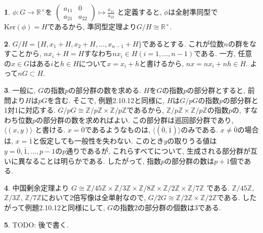 \documentclass{article}
\theoremstyle{definition}
\newtheorem{ans}{}
\numberwithin{ans}{subsection}
\newcommand{\Z}[1]{\mathbb{Z}/#1\mathbb{Z}}
\newcommand{\Ker}[1]{\mathrm{Ker}(#1)}
\begin{document}
\begin{ans}
  $\phi: G \rightarrow \mathbb{R}^\times$を
  $\begin{pmatrix}
    a_{11} & 0 \\
    a_{21} & a_{22}
  \end{pmatrix} \mapsto \frac{a_{11}}{a_{22}}$
  と定義すると, $\phi$は全射準同型で$\Ker{\phi} = H$であるから,
  準同型定理より$G/H \cong \mathbb{R}^\times$.
\end{ans}

\begin{ans}
  $G/H = \{H, x_1 + H, x_2 + H,..., x_{n-1} + H\}$であるとする.
  これが位数$n$の群をなすことから, $nx_i + H = H$すなわち$nx_i \in H (i = 1,..., n-1)$である.
  一方, 任意の$x \in G$はある$i$と$h \in H$について$x = x_i + h$と書けるから,
  $nx = nx_i + nh \in H$. よって$nG \subset H$.
\end{ans}

\begin{ans}
  一般に, $G$の指数$p$の部分群の数を求める.
  $H$を$G$の指数$p$の部分群とすると, 前問より$H$は$pG$を含む.
  そこで, 例題2.10.12と同様に, $H$は$G/pG$の指数$p$の部分群と1対1に対応する.
  $G/pG \cong \Z{p} \times \Z{p}$であるから,
  $\Z{p} \times \Z{p}$の指数$p$の, すなわち位数$p$の部分群の数を求めればよい.
  この部分群は巡回部分群であり, $\langle(x, y)\rangle$ と書ける.
  $x = \overline{0}$であるようなものは, $\langle(\overline{0}, \overline{1})\rangle$のみである.
  $x \neq \overline{0}$の場合は, $x = \overline{1}$と仮定しても一般性を失わない.
  このとき$y$の取りうる値は$y = \overline{0}, \overline{1},..., \overline{p-1}$の$p$通りであるが,
  これらすべてについて, 生成される部分群が互いに異なることは明らかである.
  したがって, 指数$p$の部分群の数は$p + 1$個である.
\end{ans}

\begin{ans}
  中国剰余定理より
  $G \cong \Z{45} \times \Z{3} \times \Z{8} \times \Z{2} \times \Z{7}$
  である. $\Z{45}$, $\Z{3}$, $\Z{7}$において$2$倍写像は全単射なので,
  $G/2G \cong \Z{2} \times \Z{2}$である.
  したがって例題2.10.12と同様にして, $G$の指数$2$の部分群の個数は$3$である.
\end{ans}

\begin{ans}
  TODO: 後で書く.
\end{ans}
\end{document}
